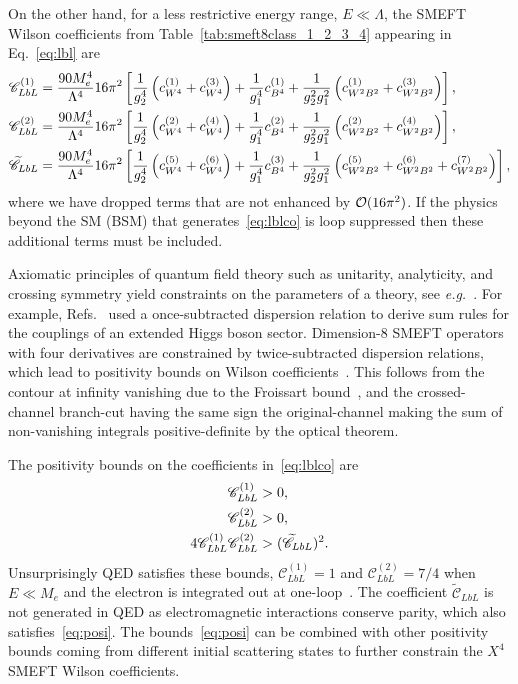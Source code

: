 On the other hand, for a less restrictive energy range, $E \ll \Lambda$, the SMEFT Wilson coefficients from Table~\ref{tab:smeft8class_1_2_3_4} appearing in Eq.~\eqref{eq:lbl} are
\begin{align}
\label{eq:lblco}
\mathscr{C}_{LbL}^{(1)} &= \frac{90 M_e^4}{\Lambda^4} 16 \pi^2 \left[ \frac{1}{g_2^4} \left( c_{W^4}^{(1)} + c_{W^4}^{(3)} \right) + \frac{1}{g_1^4} c_{B^4}^{(1)} + \frac{1}{g_2^2 g_1^2} \left( c_{W^2B^2}^{(1)} + c_{W^2B^2}^{(3)} \right) \right] , \nonumber\\ 
\mathscr{C}_{LbL}^{(2)} &= \frac{90 M_e^4}{\Lambda^4} 16 \pi^2 \left[ \frac{1}{g_2^4} \left( c_{W^4}^{(2)} + c_{W^4}^{(4)} \right) + \frac{1}{g_1^4} c_{B^4}^{(2)} + \frac{1}{g_2^2 g_1^2} \left( c_{W^2B^2}^{(2)} + c_{W^2B^2}^{(4)} \right)  \right] , \nonumber\\ 
\widetilde{\mathscr{C}}_{LbL} &= \frac{90 M_e^4}{\Lambda^4} 16 \pi^2 \left[ \frac{1}{g_2^4} \left( c_{W^4}^{(5)} + c_{W^4}^{(6)} \right) + \frac{1}{g_1^4} c_{B^4}^{(3)} + \frac{1}{g_2^2 g_1^2} \left( c_{W^2B^2}^{(5)} + c_{W^2B^2}^{(6)} + c_{W^2B^2}^{(7)} \right)  \right] ,
\end{align}
where we have dropped terms that are not enhanced by $\mathcal{O}(16 \pi^2)$.
If the physics beyond the SM (BSM) that generates~\eqref{eq:lblco} is loop suppressed then these additional terms must be included.

Axiomatic principles of quantum field theory such as unitarity, analyticity, and crossing symmetry yield constraints on the parameters of a theory, see \textit{e.g.}~\cite{Manohar:2008tc, Bellazzini:2016xrt}. 
For example, Refs.~\cite{Gunion:1990kf, Grinstein:2013fia} used a once-subtracted dispersion relation to derive sum rules for the couplings of an extended Higgs boson sector.
Dimension-8 SMEFT operators with four derivatives are constrained by twice-subtracted dispersion relations, which lead to positivity bounds on Wilson coefficients~\cite{Bellazzini:2018paj, Zhang:2018shp, Bi:2019phv, Remmen:2019cyz, Remmen:2020vts}.
This follows from the contour at infinity vanishing due to the Froissart bound~\cite{Froissart:1961ux}, and the crossed-channel branch-cut having the same sign the original-channel making the sum of non-vanishing integrals positive-definite by the optical theorem.

The positivity bounds on the coefficients in~\eqref{eq:lblco} are~\cite{Remmen:2019cyz}
\begin{align}
\label{eq:posi}
\mathscr{C}_{LbL}^{(1)} &> 0 , \nonumber\\ 
\mathscr{C}_{LbL}^{(2)} &> 0 , \nonumber\\ 
4 \mathscr{C}_{LbL}^{(1)} \mathscr{C}_{LbL}^{(2)} &> (\widetilde{\mathscr{C}}_{LbL})^2 .
\end{align}
Unsurprisingly QED satisfies these bounds, $\mathscr{C}_{LbL}^{(1)} = 1$ and $\mathscr{C}_{LbL}^{(2)} = 7 / 4$ when $E \ll M_e$ and the electron is integrated out at one-loop~\cite{Schwinger:1951nm}.
The coefficient $\widetilde{\mathscr{C}}_{LbL}$ is not generated in QED as electromagnetic interactions conserve parity, which also satisfies~\eqref{eq:posi}.
The bounds~\ref{eq:posi} can be combined with other positivity bounds coming from different initial scattering states to further constrain the $X^4$ SMEFT Wilson coefficients.

